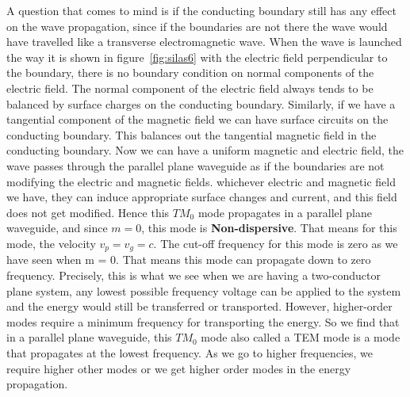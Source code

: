 A question that comes to mind is if the conducting boundary still has any effect on the wave propagation, since if the boundaries are not there the wave would have travelled like a transverse electromagnetic wave. When the wave is launched the way it is shown in figure~\ref{fig:silas6} with the electric field perpendicular to the boundary, there is no boundary condition on normal components of the electric field. The normal component of the electric field always tends to be balanced by surface charges on the conducting boundary. Similarly, if we have a tangential component of the magnetic field we can have surface circuits on the conducting boundary. This balances out the tangential magnetic field in the conducting boundary. Now we can have a uniform magnetic and electric field, the wave passes through the parallel plane waveguide as if the boundaries are not modifying the electric and magnetic fields. whichever electric and magnetic field we have, they can induce appropriate surface changes and current, and this field does not get modified. Hence this $TM_0$ mode propagates in a parallel plane waveguide, and since $m = 0$, this mode is \textbf{Non-dispersive}. That means for this mode, the velocity $v_{p}=v_{g}=c$. The cut-off frequency for this mode is zero as we have seen when m = 0. That means this mode can propagate down to zero frequency. Precisely, this is what we see when we are having a two-conductor plane system, any lowest possible frequency voltage can be applied to the system and the energy would still be transferred or transported. However, higher-order modes require a minimum frequency for transporting the energy. So we find that in a parallel plane waveguide, this $TM_0$ mode also called a TEM mode is a mode that propagates at the lowest frequency. As we go to higher frequencies, we require higher other modes or we get higher order modes in the energy propagation.

